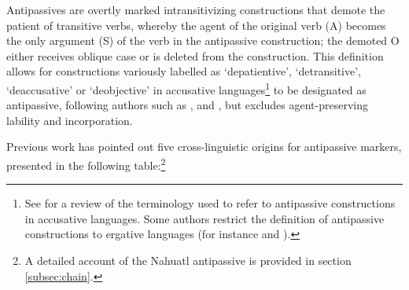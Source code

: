 \documentclass[oldfontcommands,oneside,a4paper,11pt]{article}
\begin{document}
Antipassives  are  overtly marked intransitivizing constructions that demote the patient of transitive verbs, whereby the agent of the original verb (A)  becomes the only argument (S) of the verb in the antipassive construction; the demoted O either receives oblique case or is deleted from the construction. This definition allows for constructions variously labelled as `depatientive', `detransitive', `deaccusative' or `deobjective' in accusative languages\footnote{See  \citet{janic.these} for a review of the terminology used to refer to antipassive constructions in accusative languages. Some authors restrict the definition of antipassive constructions to ergative languages (for instance \citealt{dixon94erg} and \citealt{cooreman94antipassive}).} to be designated as antipassive, following authors such as \citealt{heath76antipassive}, \citet{polinsky11antipassive} and  	\citet{creissels12antip}, but excludes agent-preserving lability and incorporation.
 


 Previous work has pointed out five cross-linguistic origins for antipassive markers, presented in the following table:\footnote{A detailed account of the Nahuatl antipassive is provided in section \ref{subsec:chain}. }
 
\end{document}
